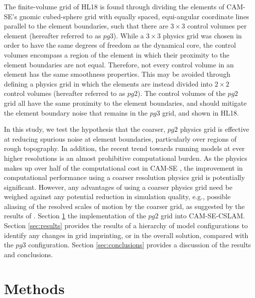 \documentclass{agujournal}
\begin{document}
The finite-volume grid of HL18 is found through dividing the elements of CAM-SE's gnomic cubed-sphere grid with equally spaced, equi-angular coordinate lines parallel to the element boundaries, such that there are $3\times 3$ control volumes per element (hereafter referred to as $pg3$). While a $3\times 3$ physics grid was chosen in order to have the same degrees of freedom as the dynamical core, the control volumes encompass a region of the element in which their proximity to the element boundaries are not equal. Therefore, not every control volume in an element has the same smoothness properties. This may be avoided through defining a physics grid in which the elements are instead divided into $2\times 2$ control volumes (hereafter referred to as $pg2$). The control volumes of the $pg2$ grid all have the same proximity to the element boundaries, and should mitigate the element boundary noise that remains in the $pg3$ grid, and shown in HL18.

In this study, we test the hypothesis that the coarser, $pg2$ physics grid is effective at reducing spurious noise at element boundaries, particularly over regions of rough topography. In addition, the recent trend towards running models at ever higher resolutions is an almost prohibitive computational burden. As the physics makes up over half of the computational cost in CAM-SE \citep{LetAl2018JAMES}, the improvement in computational performance using a coarser resolution physics grid is potentially significant. However, any advantages of using a coarser physics grid need be weighed against any potential reduction in simulation quality, e.g., possible aliasing of the resolved scales of motion by the coarser grid, as suggested by the results of \cite{W1999T}. Section \ref{sec:methods} the implementation of the $pg2$ grid into CAM-SE-CSLAM. Section \ref{sec:results} provides the results of a hierarchy of model configurations to identify any changes in grid imprinting, or in the overall solution, compared with the $pg3$ configuration. Section \ref{sec:conclusions} provides a discussion of the results and conclusions.

\section{Methods}\label{sec:methods}


\end{document}
